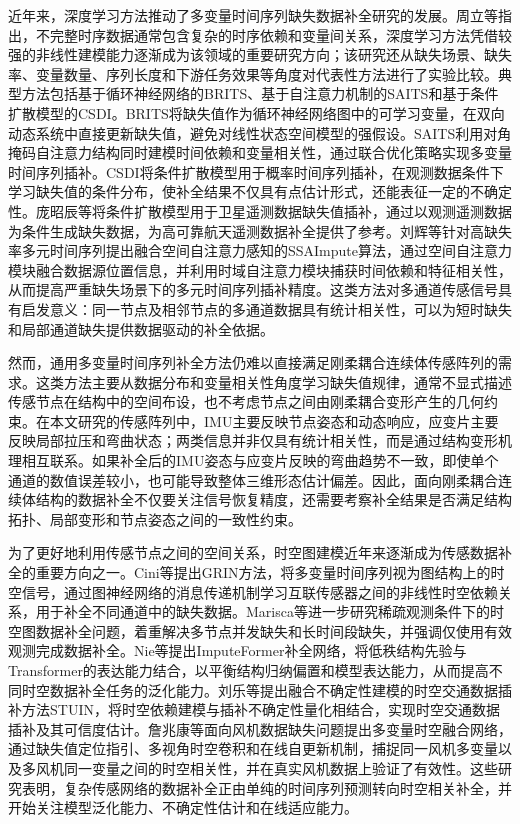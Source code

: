 近年来，深度学习方法推动了多变量时间序列缺失数据补全研究的发展。周立等指出，不完整时序数据通常包含复杂的时序依赖和变量间关系，深度学习方法凭借较强的非线性建模能力逐渐成为该领域的重要研究方向；该研究还从缺失场景、缺失率、变量数量、序列长度和下游任务效果等角度对代表性方法进行了实验比较\cite{zhou2025survey}。典型方法包括基于循环神经网络的BRITS、基于自注意力机制的SAITS和基于条件扩散模型的CSDI。BRITS将缺失值作为循环神经网络图中的可学习变量，在双向动态系统中直接更新缺失值，避免对线性状态空间模型的强假设\cite{cao2018brits}。SAITS利用对角掩码自注意力结构同时建模时间依赖和变量相关性，通过联合优化策略实现多变量时间序列插补\cite{du2023saits}。CSDI将条件扩散模型用于概率时间序列插补，在观测数据条件下学习缺失值的条件分布，使补全结果不仅具有点估计形式，还能表征一定的不确定性\cite{tashiro2021csdi}。庞昭辰等将条件扩散模型用于卫星遥测数据缺失值插补，通过以观测遥测数据为条件生成缺失数据，为高可靠航天遥测数据补全提供了参考\cite{pang2025satellite}。刘辉等针对高缺失率多元时间序列提出融合空间自注意力感知的SSAImpute算法，通过空间自注意力模块融合数据源位置信息，并利用时域自注意力模块捕获时间依赖和特征相关性，从而提高严重缺失场景下的多元时间序列插补精度\cite{liu2025ssaimpute}。这类方法对多通道传感信号具有启发意义：同一节点及相邻节点的多通道数据具有统计相关性，可以为短时缺失和局部通道缺失提供数据驱动的补全依据。

然而，通用多变量时间序列补全方法仍难以直接满足刚柔耦合连续体传感阵列的需求。这类方法主要从数据分布和变量相关性角度学习缺失值规律，通常不显式描述传感节点在结构中的空间布设，也不考虑节点之间由刚柔耦合变形产生的几何约束。在本文研究的传感阵列中，IMU主要反映节点姿态和动态响应，应变片主要反映局部拉压和弯曲状态；两类信息并非仅具有统计相关性，而是通过结构变形机理相互联系。如果补全后的IMU姿态与应变片反映的弯曲趋势不一致，即使单个通道的数值误差较小，也可能导致整体三维形态估计偏差。因此，面向刚柔耦合连续体结构的数据补全不仅要关注信号恢复精度，还需要考察补全结果是否满足结构拓扑、局部变形和节点姿态之间的一致性约束。

为了更好地利用传感节点之间的空间关系，时空图建模近年来逐渐成为传感数据补全的重要方向之一。Cini等提出GRIN方法，将多变量时间序列视为图结构上的时空信号，通过图神经网络的消息传递机制学习互联传感器之间的非线性时空依赖关系，用于补全不同通道中的缺失数据\cite{cini2022grin}。Marisca等进一步研究稀疏观测条件下的时空图数据补全问题，着重解决多节点并发缺失和长时间段缺失，并强调仅使用有效观测完成数据补全\cite{marisca2022learning}。Nie等提出ImputeFormer补全网络，将低秩结构先验与Transformer的表达能力结合，以平衡结构归纳偏置和模型表达能力，从而提高不同时空数据补全任务的泛化能力\cite{nie2024imputeformer}。刘乐等提出融合不确定性建模的时空交通数据插补方法STUIN，将时空依赖建模与插补不确定性量化相结合，实现时空交通数据插补及其可信度估计\cite{liu2024stuin}。詹兆康等面向风机数据缺失问题提出多变量时空融合网络，通过缺失值定位指引、多视角时空卷积和在线自更新机制，捕捉同一风机多变量以及多风机同一变量之间的时空相关性，并在真实风机数据上验证了有效性\cite{zhan2024wind}。这些研究表明，复杂传感网络的数据补全正由单纯的时间序列预测转向时空相关补全，并开始关注模型泛化能力、不确定性估计和在线适应能力。

